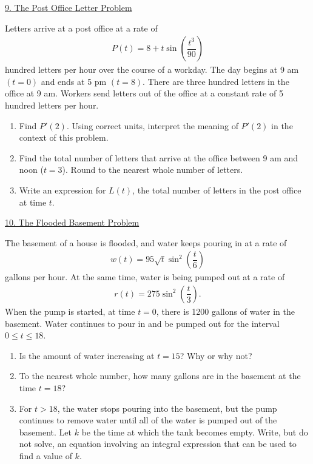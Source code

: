 \begin{center}
    \underline{9. The Post Office Letter Problem}
\end{center}

Letters arrive at a post office at a rate of \begin{align*}
    P(t) = 8 + t\sin \left(\dfrac{t^3}{90}\right)
\end{align*}
hundred letters per hour over the course of a workday. The day begins at 9 am $(t = 0)$ and ends at 5 pm $(t = 8)$. There are three hundred letters in the office at 9 am. Workers send letters out of the office at a constant rate of 5 hundred letters per hour. \\
\begin{enumerate}[label=\hspace{11pt}(\alph*), align=left, leftmargin=*, labelsep=0.25em]
    \item Find $P'(2)$. Using correct units, interpret the meaning of $P'(2)$ in the context of this problem.
    \item Find the total number of letters that arrive at the office between 9 am and noon ($t = 3$). Round to the nearest whole number of letters.
    \item Write an expression for $L(t)$, the total number of letters in the post office at time $t$.
\end{enumerate} \vspace{11pt}

\begin{center}
    \underline{10. The Flooded Basement Problem}
\end{center}

The basement of a house is flooded, and water keeps pouring in at a rate of \begin{align*}
    w(t) = 95\sqrt{t}\sin^2 \left(\dfrac{t}{6}\right)
\end{align*}
gallons per hour. At the same time, water is being pumped out at a rate of \begin{align*}
    r(t) = 275\sin^2 \left(\dfrac{t}{3}\right).
\end{align*}
When the pump is started, at time $t = 0$, there is 1200 gallons of water in the basement. Water continues to pour in and be pumped out for the interval $0 \leq t \leq 18$. \\
\begin{enumerate}[label=\hspace{11pt}(\alph*), align=left, leftmargin=*, labelsep=0.25em]
    \item Is the amount of water increasing at $t = 15$? Why or why not?
    \item To the nearest whole number, how many gallons are in the basement at the time $t = 18$?
    \item For $t > 18$, the water stops pouring into the basement, but the pump continues to remove water until all of the water is pumped out of the basement. Let $k$ be the time at which the tank becomes empty. Write, but do not solve, an equation involving an integral expression that can be used to find a value of $k$.
\end{enumerate} \vspace{11pt}

